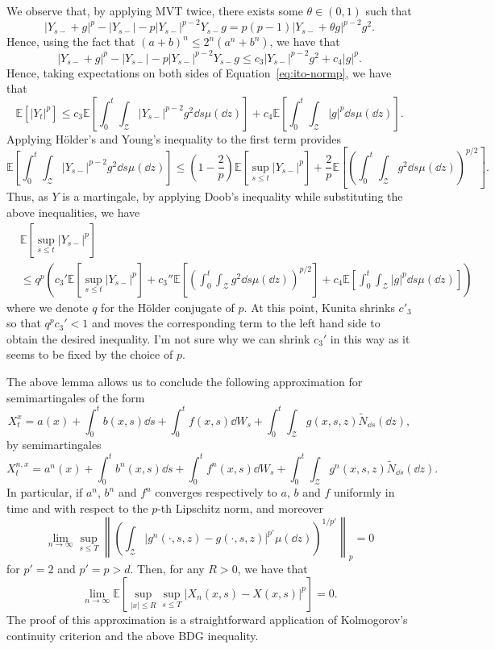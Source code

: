 \documentclass[]{article}
\theoremstyle{definition}
\theoremstyle{definition}
\begin{document}
We observe that, by applying MVT twice, there exists some \(\theta \in (0, 1)\) such that 
\[|Y_{s-} + g|^p - |Y_{s-}| - p|Y_{s-}|^{p - 2} Y_{s-} g = p(p - 1)|Y_{s-} + \theta g|^{p - 2}g^2.\]
Hence, using the fact that \((a + b)^n \le 2^n(a^n + b^n)\), we have that 
\[|Y_{s-} + g|^p - |Y_{s-}| - p|Y_{s-}|^{p - 2} Y_{s-} g \le c_3 |Y_{s-}|^{p - 2}g^2 + c_4|g|^p.\]
Hence, taking expectations on both sides of Equation~\eqref{eq:ito-normp}, we have that
\[\mathbb{E}[|Y_t|^p] \le c_3\mathbb{E}\left[\int_0^t \int_\mathcal{Z} |Y_{s-}|^{p - 2}g^2 \dd s \mu(\dd z)\right]
 + c_4\mathbb{E}\left[\int_0^t \int_\mathcal{Z} |g|^p \dd s \mu(\dd z)\right].\]
Applying H\"older's and Young's inequality to the first term provides 
\[\mathbb{E}\left[\int_0^t \int_\mathcal{Z} |Y_{s-}|^{p - 2}g^2 \dd s \mu(\dd z)\right]
  \le \left(1 - \frac{2}{p}\right)\mathbb{E}\left[\sup_{s \le t}|Y_{s-}|^p\right]
  + \frac{2}{p}\mathbb{E}\left[\left(\int_0^t \int_\mathcal{Z} g^2 \dd s \mu(\dd z)\right)^{p / 2}\right].\]
Thus, as \(Y\) is a martingale, by applying Doob's inequality while substituting the above inequalities, 
we have 
\begin{align*}
  & \mathbb{E}\left[\sup_{s \le t}|Y_{s-}|^p\right] \\
  & \le q^p\left(c_3'\mathbb{E}\left[\sup_{s \le t}|Y_{s-}|^p\right]
    + c_3'' \mathbb{E}\left[\left(\int_0^t \int_\mathcal{Z} g^2 \dd s \mu(\dd z)\right)^{p / 2}\right]
    + c_4\mathbb{E}\left[\int_0^t \int_\mathcal{Z} |g|^p \dd s \mu(\dd z)\right]\right)
\end{align*}
where we denote \(q\) for the H\"older conjugate of \(p\). At this point, Kunita shrinks \(c'_3\) so 
that \(q^p c_3' < 1\) and moves the corresponding term to the left hand side to obtain the desired inequality.
I'm not sure why we can shrink \(c_3'\) in this way as it seems to be fixed by the choice of \(p\).

The above lemma allows us to conclude the following approximation for semimartingales of the form 
\[X^x_t = a(x) + \int_0^t b(x, s) \dd s + \int_0^t f(x, s) \dd W_s + \int_0^t \int_\mathcal{Z} g(x, s, z) \tilde N_{\dd s}(\dd z),\]
by semimartingales
\[X^{n, x}_t = a^n(x) + \int_0^t b^n(x, s) \dd s + \int_0^t f^n(x, s) \dd W_s 
  + \int_0^t \int_\mathcal{Z} g^n(x, s, z) \tilde N_{\dd s}(\dd z).\]
In particular, if \(a^n\), \(b^n\) and \(f^n\) converges respectively to \(a\), \(b\) and \(f\) uniformly in time and 
with respect to the \(p\)-th Lipschitz norm, and moreover 
\[\lim_{n \to \infty} \sup_{s \le T} 
  \left\|\left(\int_\mathcal{Z} |g^n(\cdot, s, z) - g(\cdot, s, z)|^{p'} \mu(\dd z)\right)^{1/ p'}\right\|_p = 0\]
for \(p' = 2\) and \(p' = p > d\). Then, for any \(R > 0\), we have that 
\[\lim_{n \to \infty} \mathbb{E}\left[\sup_{|x| \le R} \sup_{s \le T} |X_n(x, s) - X(x, s)|^p\right] = 0.\]
The proof of this approximation is a straightforward application of Kolmogorov's continuity criterion 
and the above BDG inequality.
\end{document}
